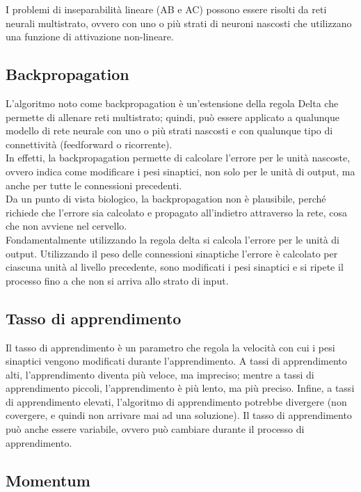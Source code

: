 I problemi di inseparabilità lineare (AB e AC) possono essere risolti da reti
neurali multistrato, ovvero con uno o più strati di neuroni nascosti che
utilizzano una funzione di attivazione non-lineare.

\subsection{Backpropagation}

L'algoritmo noto come backpropagation è un'estensione della regola Delta che
permette di allenare reti multistrato; quindi, può essere applicato a qualunque
modello di rete neurale con uno o più strati nascosti e con qualunque tipo di
connettività (feedforward o ricorrente).\\
In effetti, la backpropagation permette di calcolare l'errore per le unità
nascoste, ovvero indica come modificare i pesi sinaptici, non solo per le unità
di output, ma anche per tutte le connessioni precedenti.\\
Da un punto di vista biologico, la backpropagation non è plausibile, perché
richiede che l'errore sia calcolato e propagato all'indietro attraverso la rete,
cosa che non avviene nel cervello.\\
Fondamentalmente utilizzando la regola delta si calcola l'errore per le unità di
output. Utilizzando il peso delle connessioni sinaptiche l'errore è calcolato
per ciascuna unità al livello precedente, sono modificati i pesi sinaptici e si
ripete il processo fino a che non si arriva allo strato di input.

\subsection{Tasso di apprendimento}

Il tasso di apprendimento è un parametro che regola la velocità con cui i pesi
sinaptici vengono modificati durante l'apprendimento. A tassi di apprendimento
alti, l'apprendimento diventa più veloce, ma impreciso; mentre a tassi di
apprendimento piccoli, l'apprendimento è più lento, ma più preciso. Infine, a
tassi di apprendimento elevati, l'algoritmo di apprendimento potrebbe divergere
(non covergere, e quindi non arrivare mai ad una soluzione). Il tasso di
apprendimento può anche essere variabile, ovvero può cambiare durante il
processo di apprendimento.

\subsection{Momentum}

